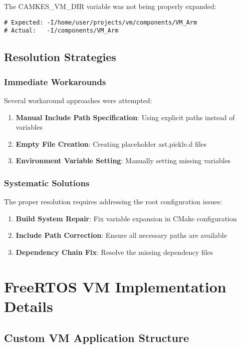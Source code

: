 \documentclass[11pt,a4paper]{article}
\begin{document}
The CAMKES\_VM\_DIR variable was not being properly expanded:

\begin{lstlisting}[caption=Variable Expansion Problem]
# Expected: -I/home/user/projects/vm/components/VM_Arm
# Actual:   -I/components/VM_Arm
\end{lstlisting}

\subsection{Resolution Strategies}

\subsubsection{Immediate Workarounds}

Several workaround approaches were attempted:

\begin{enumerate}
\item \textbf{Manual Include Path Specification}: Using explicit paths instead of variables
\item \textbf{Empty File Creation}: Creating placeholder ast.pickle.d files
\item \textbf{Environment Variable Setting}: Manually setting missing variables
\end{enumerate}

\subsubsection{Systematic Solutions}

The proper resolution requires addressing the root configuration issues:

\begin{enumerate}
\item \textbf{Build System Repair}: Fix variable expansion in CMake configuration
\item \textbf{Include Path Correction}: Ensure all necessary paths are available
\item \textbf{Dependency Chain Fix}: Resolve the missing dependency files
\end{enumerate}

\section{FreeRTOS VM Implementation Details}

\subsection{Custom VM Application Structure}
\end{document}

